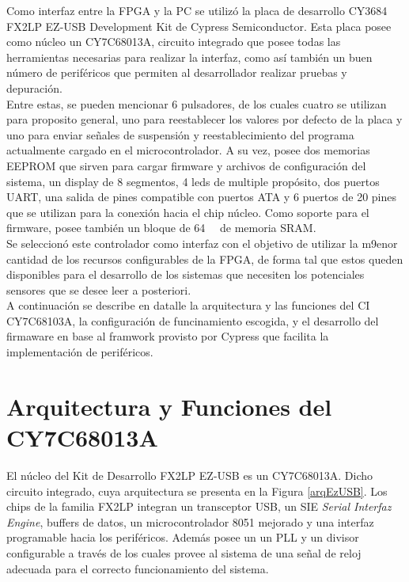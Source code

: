 	Como interfaz entre la FPGA y la PC se utilizó la placa de desarrollo CY3684 FX2LP EZ-USB Development Kit de Cypress Semiconductor. Esta placa posee como núcleo un CY7C68013A, circuito integrado que posee todas las herramientas necesarias para realizar la interfaz, como así también un buen número de periféricos que permiten al desarrollador realizar pruebas y depuración.\\
	
	Entre estas, se pueden mencionar 6 pulsadores, de los cuales cuatro se utilizan para proposito general, uno para reestablecer los valores por defecto de la placa y uno para enviar señales de suspensión y reestablecimiento del programa actualmente cargado en el microcontrolador. A su vez, posee dos memorias EEPROM que sirven para cargar firmware y archivos de configuración del sistema, un display de 8 segmentos, 4 leds de multiple propósito, dos puertos UART, una salida de pines compatible con puertos ATA y 6 puertos de 20 pines que se utilizan para la conexión hacia el chip núcleo. Como soporte para el firmware, posee también un bloque de \SI{64}{\kilo\byte} de memoria SRAM.\\
	
	Se seleccionó este controlador como interfaz con el objetivo de utilizar la m9enor cantidad de los recursos configurables de la FPGA, de forma tal que estos queden disponibles para el desarrollo de los sistemas que necesiten los potenciales sensores que se desee leer a posteriori.\\
	
	A continuación se describe en datalle la arquitectura y las funciones del CI CY7C68103A, la configuración de funcinamiento escogida, y el desarrollo del firmaware en base al framwork provisto por Cypress que facilita la implementación de periféricos.\\
	
	\section{Arquitectura y Funciones del CY7C68013A}
	El núcleo del Kit de Desarrollo FX2LP EZ-USB es un CY7C68013A. Dicho circuito integrado, cuya arquitectura se presenta en la Figura \ref{arqEzUSB}. Los chips de la familia FX2LP integran un transceptor USB, un SIE {\it Serial Interfaz Engine}, buffers de datos, un microcontrolador 8051 mejorado y una interfaz programable hacia los periféricos. Además posee un un PLL y un divisor configurable a través de los cuales provee al sistema de una señal de reloj adecuada para el correcto funcionamiento del sistema.\\
	
